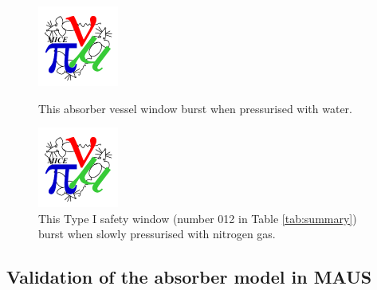 \begin{figure}
  \begin{minipage}{0.46\textwidth}
    \centerline{\includegraphics*[height=0.76\textwidth]{Window_Burst2}}
    \caption{
      This absorber vessel window burst when pressurised with water.
    }  
    \label{Burst_Absorber}
  \end{minipage} \hfill
  \begin{minipage}{0.46\textwidth}
    \centerline{\includegraphics*[height=0.75\textwidth]{Safety_Burst2}}
    \caption{
      This Type I safety window (number 012 in Table \ref{tab:summary})
      burst when slowly pressurised with nitrogen gas.
    } 
    \label{Burst_Safety}
  \end{minipage}
\end{figure}

\subsection{Validation of the absorber model in MAUS}
\label{SubSect:Absorber_Validation}

